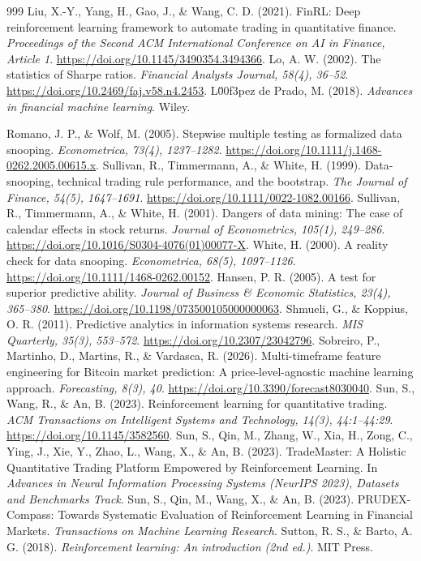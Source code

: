 \documentclass[11pt,a4paper]{article}
\begin{document}
\begin{thebibliography}{999}
 Liu, X.-Y., Yang, H., Gao, J., \& Wang, C. D. (2021). FinRL: Deep reinforcement learning framework to automate trading in quantitative finance. \emph{Proceedings of the Second ACM International Conference on AI in Finance, Article 1}. \url{https://doi.org/10.1145/3490354.3494366}.
 Lo, A. W. (2002). The statistics of Sharpe ratios. \emph{Financial Analysts Journal, 58(4), 36--52}. \url{https://doi.org/10.2469/faj.v58.n4.2453}.
 L\u00f3pez de Prado, M. (2018). \emph{Advances in financial machine learning}. Wiley.

 Romano, J. P., \& Wolf, M. (2005). Stepwise multiple testing as formalized data snooping. \emph{Econometrica, 73(4), 1237--1282}. \url{https://doi.org/10.1111/j.1468-0262.2005.00615.x}.
 Sullivan, R., Timmermann, A., \& White, H. (1999). Data-snooping, technical trading rule performance, and the bootstrap. \emph{The Journal of Finance, 54(5), 1647--1691}. \url{https://doi.org/10.1111/0022-1082.00166}.
 Sullivan, R., Timmermann, A., \& White, H. (2001). Dangers of data mining: The case of calendar effects in stock returns. \emph{Journal of Econometrics, 105(1), 249--286}. \url{https://doi.org/10.1016/S0304-4076(01)00077-X}.
 White, H. (2000). A reality check for data snooping. \emph{Econometrica, 68(5), 1097--1126}. \url{https://doi.org/10.1111/1468-0262.00152}.
 Hansen, P. R. (2005). A test for superior predictive ability. \emph{Journal of Business \& Economic Statistics, 23(4), 365--380}. \url{https://doi.org/10.1198/073500105000000063}.
 Shmueli, G., \& Koppius, O. R. (2011). Predictive analytics in information systems research. \emph{MIS Quarterly, 35(3), 553--572}. \url{https://doi.org/10.2307/23042796}.
 Sobreiro, P., Martinho, D., Martins, R., \& Vardasca, R. (2026). Multi-timeframe feature engineering for Bitcoin market prediction: A price-level-agnostic machine learning approach. \emph{Forecasting, 8(3), 40}. \url{https://doi.org/10.3390/forecast8030040}.
 Sun, S., Wang, R., \& An, B. (2023). Reinforcement learning for quantitative trading. \emph{ACM Transactions on Intelligent Systems and Technology, 14(3), 44:1--44:29}. \url{https://doi.org/10.1145/3582560}.
 Sun, S., Qin, M., Zhang, W., Xia, H., Zong, C., Ying, J., Xie, Y., Zhao, L., Wang, X., \& An, B. (2023). TradeMaster: A Holistic Quantitative Trading Platform Empowered by Reinforcement Learning. In \emph{Advances in Neural Information Processing Systems (NeurIPS 2023), Datasets and Benchmarks Track}.
 Sun, S., Qin, M., Wang, X., \& An, B. (2023). PRUDEX-Compass: Towards Systematic Evaluation of Reinforcement Learning in Financial Markets. \emph{Transactions on Machine Learning Research}.
 Sutton, R. S., \& Barto, A. G. (2018). \emph{Reinforcement learning: An introduction (2nd ed.)}. MIT Press.


\end{thebibliography}
\end{document}
